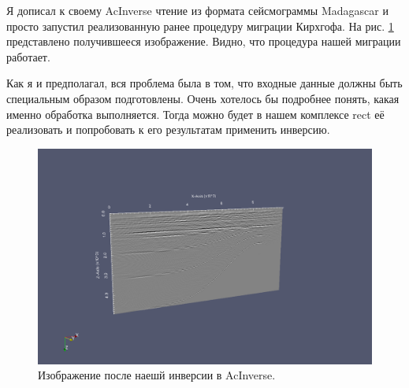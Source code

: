 \documentclass{article}
\begin{document}
Я дописал к своему AcInverse чтение из формата сейсмограммы Madagascar и просто запустил реализованную ранее процедуру миграции Кирхгофа.
На рис. \ref{img_acinverse_inverted} представлено получившееся изображение.
Видно, что процедура нашей миграции работает.

Как я и предполагал, вся проблема была в том, что входные данные должны быть специальным образом подготовлены.
Очень хотелось бы подробнее понять, какая именно обработка выполняется.
Тогда можно будет в нашем комплексе rect её реализовать и попробовать к его результатам применить инверсию.

\begin{figure}[ht]
  \center
  \includegraphics[scale=0.3]{pic/acinverse_inverted.png}
  \caption{Изображение после наешй инверсии в AcInverse.}
\label{img_acinverse_inverted}
\end{figure}
\end{document}
